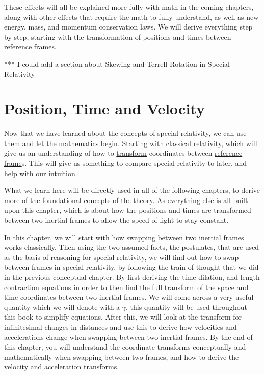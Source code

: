 These effects will all be explained more fully with math in the coming chapters, along with other effects that require the math to fully understand, as well as new energy, mass, and momentum conservation laws.
We will derive everything step by step, starting with the transformation of positions and times between reference frames.



*** I could add a section about Skewing and Terrell Rotation in Special Relativity

\printbibliography[segment=\therefsegment, heading=subbibliography] %

\chapter{Position, Time and Velocity} \label{ch: Position, Time and Velocity} %

Now that we have learned about the concepts of special relativity, we can use them and let the mathematics begin.
Starting with classical relativity, which will give us an understanding of how to \hyperlink{def-transform}{transform} coordinates between \hyperlink{def-Reference-frame}{reference frame}s.
This will give us something to compare special relativity to later, and help with our intuition.

What we learn here will be directly used in all of the following chapters, to derive more of the foundational concepts of the theory.
As everything else is all built upon this chapter, which is about how the positions and times are transformed between two inertial frames to allow the speed of light to stay constant.

In this chapter, we will start with how swapping between two inertial frames works classically.
Then using the two assumed facts, the postulates, that are used as the basis of reasoning for special relativity, we will find out how to swap between frames in special relativity, by following the train of thought that we did in the previous conceptual chapter.
By first deriving the time dilation, and length contraction equations in order to then find the full transform of the space and time coordinates between two inertial frames.
We will come across a very useful quantity which we will denote with a ${\gamma}$, this quantity will be used throughout this book to simplify equations.
After this, we will look at the transform for infinitesimal changes in distances and use this to derive how velocities and accelerations change when swapping between two inertial frames.
By the end of this chapter, you will understand the coordinate transforms conceptually and mathematically when swapping between two frames, and how to derive the velocity and acceleration transforms.

